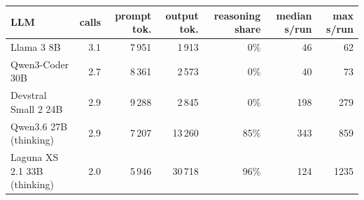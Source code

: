 \begin{tabular}{@{}lrrrrrr@{}}\toprule
LLM & calls & prompt tok. & output tok. & reasoning share & median s/run & max s/run \\ \midrule
Llama 3 8B & 3.1 & 7\,951 & 1\,913 & 0\% & 46 & 62 \\
Qwen3-Coder 30B & 2.7 & 8\,361 & 2\,573 & 0\% & 40 & 73 \\
Devstral Small 2 24B & 2.9 & 9\,288 & 2\,845 & 0\% & 198 & 279 \\
Qwen3.6 27B (thinking) & 2.9 & 7\,207 & 13\,260 & 85\% & 343 & 859 \\
Laguna XS 2.1 33B (thinking) & 2.0 & 5\,946 & 30\,718 & 96\% & 124 & 1235 \\
\bottomrule\end{tabular}